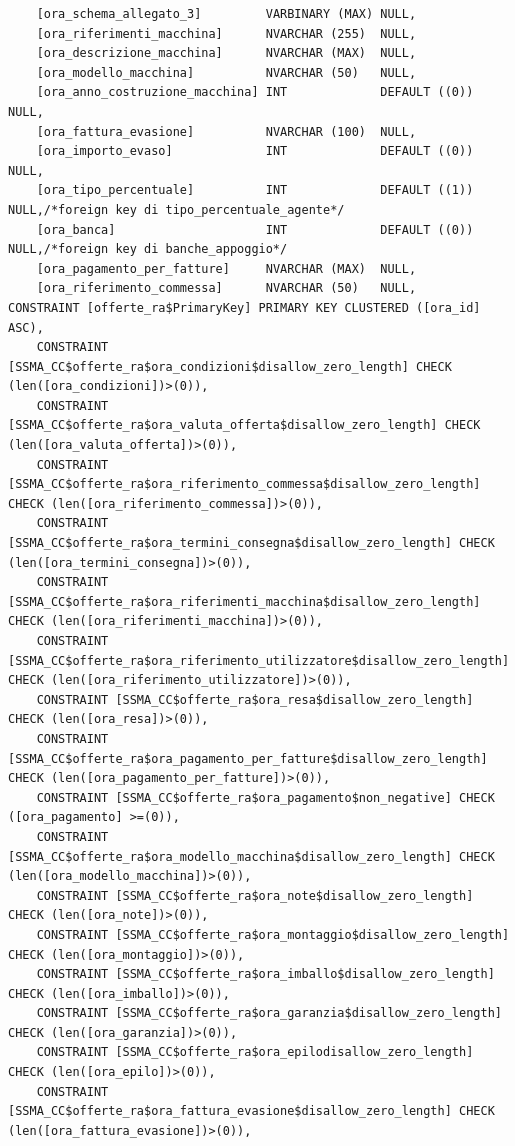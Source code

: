 \documentclass[12pt]{article}
\begin{document}
\begin{lstlisting}
    [ora_schema_allegato_3]         VARBINARY (MAX) NULL,
    [ora_riferimenti_macchina]      NVARCHAR (255)  NULL,
    [ora_descrizione_macchina]      NVARCHAR (MAX)  NULL,
    [ora_modello_macchina]          NVARCHAR (50)   NULL,
    [ora_anno_costruzione_macchina] INT             DEFAULT ((0)) NULL,
    [ora_fattura_evasione]          NVARCHAR (100)  NULL,
    [ora_importo_evaso]             INT             DEFAULT ((0)) NULL,
    [ora_tipo_percentuale]          INT             DEFAULT ((1)) NULL,/*foreign key di tipo_percentuale_agente*/
    [ora_banca]                     INT             DEFAULT ((0)) NULL,/*foreign key di banche_appoggio*/
    [ora_pagamento_per_fatture]     NVARCHAR (MAX)  NULL,
    [ora_riferimento_commessa]      NVARCHAR (50)   NULL,
CONSTRAINT [offerte_ra$PrimaryKey] PRIMARY KEY CLUSTERED ([ora_id] ASC),
    CONSTRAINT [SSMA_CC$offerte_ra$ora_condizioni$disallow_zero_length] CHECK (len([ora_condizioni])>(0)),
    CONSTRAINT [SSMA_CC$offerte_ra$ora_valuta_offerta$disallow_zero_length] CHECK (len([ora_valuta_offerta])>(0)),
    CONSTRAINT [SSMA_CC$offerte_ra$ora_riferimento_commessa$disallow_zero_length] CHECK (len([ora_riferimento_commessa])>(0)),
    CONSTRAINT [SSMA_CC$offerte_ra$ora_termini_consegna$disallow_zero_length] CHECK (len([ora_termini_consegna])>(0)),
    CONSTRAINT [SSMA_CC$offerte_ra$ora_riferimenti_macchina$disallow_zero_length] CHECK (len([ora_riferimenti_macchina])>(0)),
    CONSTRAINT [SSMA_CC$offerte_ra$ora_riferimento_utilizzatore$disallow_zero_length] CHECK (len([ora_riferimento_utilizzatore])>(0)),
    CONSTRAINT [SSMA_CC$offerte_ra$ora_resa$disallow_zero_length] CHECK (len([ora_resa])>(0)),
    CONSTRAINT [SSMA_CC$offerte_ra$ora_pagamento_per_fatture$disallow_zero_length] CHECK (len([ora_pagamento_per_fatture])>(0)),
    CONSTRAINT [SSMA_CC$offerte_ra$ora_pagamento$non_negative] CHECK ([ora_pagamento] >=(0)),
    CONSTRAINT [SSMA_CC$offerte_ra$ora_modello_macchina$disallow_zero_length] CHECK (len([ora_modello_macchina])>(0)),
    CONSTRAINT [SSMA_CC$offerte_ra$ora_note$disallow_zero_length] CHECK (len([ora_note])>(0)),
    CONSTRAINT [SSMA_CC$offerte_ra$ora_montaggio$disallow_zero_length] CHECK (len([ora_montaggio])>(0)),
    CONSTRAINT [SSMA_CC$offerte_ra$ora_imballo$disallow_zero_length] CHECK (len([ora_imballo])>(0)),
    CONSTRAINT [SSMA_CC$offerte_ra$ora_garanzia$disallow_zero_length] CHECK (len([ora_garanzia])>(0)),
    CONSTRAINT [SSMA_CC$offerte_ra$ora_epilodisallow_zero_length] CHECK (len([ora_epilo])>(0)),
    CONSTRAINT [SSMA_CC$offerte_ra$ora_fattura_evasione$disallow_zero_length] CHECK (len([ora_fattura_evasione])>(0)),

\end{lstlisting}
\end{document}
